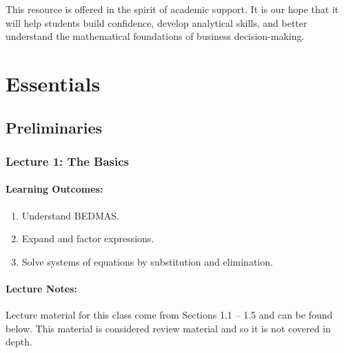 \documentclass[
]{book}
\providecommand{\tightlist}{%
  \setlength{\itemsep}{0pt}\setlength{\parskip}{0pt}}
\begin{document}
This resource is offered in the spirit of academic support. It is our hope that it will help students build confidence, develop analytical skills, and better understand the mathematical foundations of business decision-making.

\part{Essentials}\label{part-essentials}

\chapter{Preliminaries}\label{preliminaries}

\section*{Lecture 1: The Basics}\label{lecture-1-the-basics}

\subsection*{Learning Outcomes:}\label{learning-outcomes}

\begin{enumerate}
\def\labelenumi{\arabic{enumi}.}
\tightlist
\item
  Understand BEDMAS.
\item
  Expand and factor expressions.
\item
  Solve systems of equations by substitution and elimination.
\end{enumerate}

\subsection*{Lecture Notes:}\label{lecture-notes}

Lecture material for this class come from Sections 1.1 -- 1.5 and can be found below. This material is considered review material and so it is not covered in depth.
\end{document}
